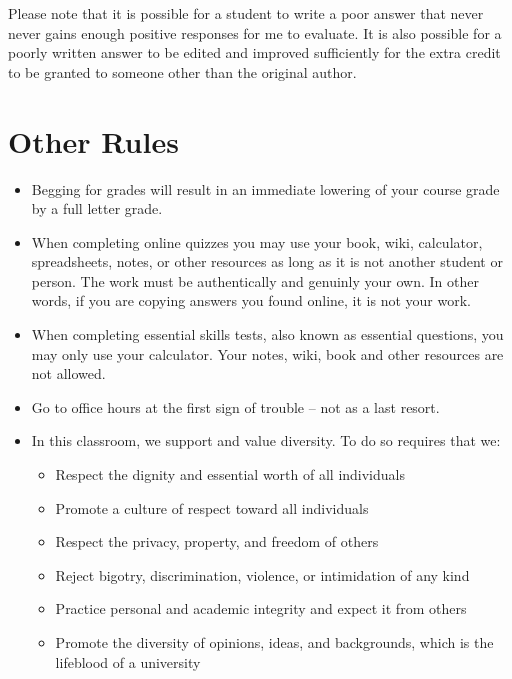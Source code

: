\documentclass[letterpaper,10pt]{article}
\newif\ifonline
\begin{document}
Please note that it is possible for a student to write a poor answer that never never gains enough positive responses for me to evaluate.  It is also possible for a poorly written answer to be edited and improved sufficiently for the extra credit to be granted to someone other than the original author.
\fi


\section{Other Rules}
\begin{itemize}


\item Begging for grades will result in an immediate lowering of your
  course grade by a full letter grade.
  
  \item When completing online quizzes you may use your book, wiki, calculator, spreadsheets, notes, or other resources as long as it is not another student or person.  The work must be authentically and genuinly your own. In other words, if you are copying answers you found online, it is not your work.
  
\ifonline

\else
   \item When completing essential skills tests, also known as essential questions, you may only use your calculator.  Your notes, wiki, book and other resources are not allowed.

\fi
\item Go to office hours at the first sign of trouble -- not as a last
  resort.

\item In this classroom, we support and value diversity.  To do so requires that we:
\begin{itemize}
   \item Respect the dignity and essential worth of all individuals
   \item Promote a culture of respect toward all individuals
    \item Respect the privacy, property, and freedom of others
    \item Reject bigotry, discrimination, violence, or intimidation of any kind
    \item Practice personal and academic integrity and expect it from others
   \item Promote the diversity of opinions, ideas, and backgrounds, which is
    the lifeblood of a university
\end{itemize}


\end{itemize}
\end{document}
